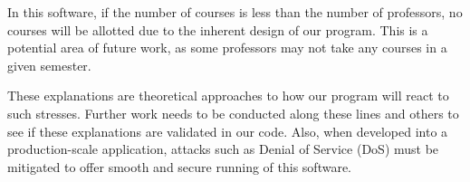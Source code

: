 \documentclass{article}
\begin{document}
        In this software, if the number of courses is less than the number of professors, no courses will be allotted due to the inherent design of our program. This is a potential area of future work, as some professors may not take any courses in a given semester.

    \bigskip

        

These explanations are theoretical approaches to how our program will react to such stresses. Further work needs to be conducted along these lines and others to see if these explanations are validated in our code. Also, when developed into a production-scale application, attacks such as Denial of Service (DoS) must be mitigated to offer smooth and secure running of this software.
\end{document}
